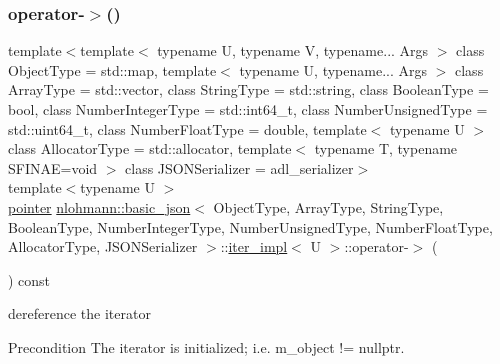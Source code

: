 \subsubsection{\texorpdfstring{operator-\/$>$()}{operator->()}}
{\footnotesize\ttfamily template$<$template$<$ typename U, typename V, typename... Args $>$ class Object\+Type = std\+::map, template$<$ typename U, typename... Args $>$ class Array\+Type = std\+::vector, class String\+Type  = std\+::string, class Boolean\+Type  = bool, class Number\+Integer\+Type  = std\+::int64\+\_\+t, class Number\+Unsigned\+Type  = std\+::uint64\+\_\+t, class Number\+Float\+Type  = double, template$<$ typename U $>$ class Allocator\+Type = std\+::allocator, template$<$ typename T, typename S\+F\+I\+N\+A\+E=void $>$ class J\+S\+O\+N\+Serializer = adl\+\_\+serializer$>$ \\
template$<$typename U $>$ \\
\mbox{\hyperlink{classnlohmann_1_1basic__json_1_1iter__impl_a3dddd7fa38b36e2531700ceb4a1ce9a8}{pointer}} \mbox{\hyperlink{classnlohmann_1_1basic__json}{nlohmann\+::basic\+\_\+json}}$<$ Object\+Type, Array\+Type, String\+Type, Boolean\+Type, Number\+Integer\+Type, Number\+Unsigned\+Type, Number\+Float\+Type, Allocator\+Type, J\+S\+O\+N\+Serializer $>$\+::\mbox{\hyperlink{classnlohmann_1_1basic__json_1_1iter__impl}{iter\+\_\+impl}}$<$ U $>$\+::operator-\/$>$ (\begin{DoxyParamCaption}{ }\end{DoxyParamCaption}) const\hspace{0.3cm}{\ttfamily [inline]}}



dereference the iterator 

\begin{DoxyPrecond}{Precondition}
The iterator is initialized; i.\+e. {\ttfamily m\+\_\+object != nullptr}. 
\end{DoxyPrecond}
\mbox{\label{classnlohmann_1_1basic__json_1_1iter__impl_a63c655881b0b7b7499a333ba77a7e4d1}} 
